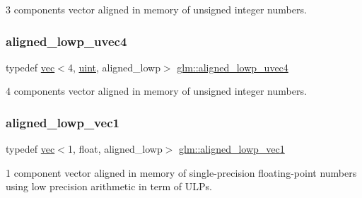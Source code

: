 3 components vector aligned in memory of unsigned integer numbers. 

\mbox{\label{group__gtc__type__aligned_ga4d1ee133cfc4f795052958ffab70d746}} 
\subsubsection{\texorpdfstring{aligned\+\_\+lowp\+\_\+uvec4}{aligned\_lowp\_uvec4}}
{\footnotesize\ttfamily typedef \mbox{\hyperlink{structglm_1_1vec}{vec}}$<$4, \mbox{\hyperlink{group__core__precision_ga4fd29415871152bfb5abd588334147c8}{uint}}, aligned\+\_\+lowp$>$ \mbox{\hyperlink{group__gtc__type__aligned_ga4d1ee133cfc4f795052958ffab70d746}{glm\+::aligned\+\_\+lowp\+\_\+uvec4}}}



4 components vector aligned in memory of unsigned integer numbers. 

\mbox{\label{group__gtc__type__aligned_ga9a7ee43ec4c9d0c59740b96c10aee479}} 
\subsubsection{\texorpdfstring{aligned\+\_\+lowp\+\_\+vec1}{aligned\_lowp\_vec1}}
{\footnotesize\ttfamily typedef \mbox{\hyperlink{structglm_1_1vec}{vec}}$<$1, float, aligned\+\_\+lowp$>$ \mbox{\hyperlink{group__gtc__type__aligned_ga9a7ee43ec4c9d0c59740b96c10aee479}{glm\+::aligned\+\_\+lowp\+\_\+vec1}}}



1 component vector aligned in memory of single-\/precision floating-\/point numbers using low precision arithmetic in term of U\+L\+Ps. 

\mbox{\label{group__gtc__type__aligned_ga10048e69ffac79ec5ea059398485114e}} 
